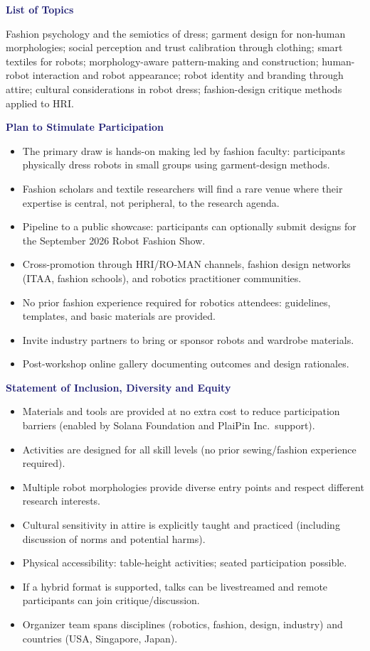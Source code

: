\documentclass[12pt,letterpaper]{article}
\newcommand{\FormSection}[1]{\par\vspace{0.75\baselineskip}\noindent{\color{MidnightBlue}\rule{\textwidth}{0.4pt}}\par\vspace{2pt}\noindent\textbf{\textcolor{MidnightBlue}{#1}}\par}
\begin{document}
\FormSection{List of Topics}
Fashion psychology and the semiotics of dress; garment design for non-human morphologies; social perception and trust calibration through clothing; smart textiles for robots; morphology-aware pattern-making and construction; human-robot interaction and robot appearance; robot identity and branding through attire; cultural considerations in robot dress; fashion-design critique methods applied to HRI.

\FormSection{Plan to Stimulate Participation}
\begin{itemize}
  \item The primary draw is hands-on making led by fashion faculty: participants physically dress robots in small groups using garment-design methods.
  \item Fashion scholars and textile researchers will find a rare venue where their expertise is central, not peripheral, to the research agenda.
  \item Pipeline to a public showcase: participants can optionally submit designs for the September 2026 Robot Fashion Show.
  \item Cross-promotion through HRI/RO-MAN channels, fashion design networks (ITAA, fashion schools), and robotics practitioner communities.
  \item No prior fashion experience required for robotics attendees: guidelines, templates, and basic materials are provided.
  \item Invite industry partners to bring or sponsor robots and wardrobe materials.
  \item Post-workshop online gallery documenting outcomes and design rationales.
\end{itemize}

\FormSection{Statement of Inclusion, Diversity and Equity}
\begin{itemize}
  \item Materials and tools are provided at no extra cost to reduce participation barriers (enabled by Solana Foundation and PlaiPin Inc.\ support).
  \item Activities are designed for all skill levels (no prior sewing/fashion experience required).
  \item Multiple robot morphologies provide diverse entry points and respect different research interests.
  \item Cultural sensitivity in attire is explicitly taught and practiced (including discussion of norms and potential harms).
  \item Physical accessibility: table-height activities; seated participation possible.
  \item If a hybrid format is supported, talks can be livestreamed and remote participants can join critique/discussion.
  \item Organizer team spans disciplines (robotics, fashion, design, industry) and countries (USA, Singapore, Japan).
\end{itemize}
\end{document}
